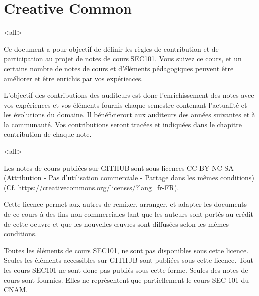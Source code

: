 
%

\section{Creative Common}

\mode<all>{
{
Ce document a pour objectif de définir les règles de contribution et de participation au projet de notes de cours SEC101. Vous suivez ce cours, et un certains nombre de notes de cours et d'éléments pédagogiques peuvent être améliorer et être enrichis par vos expériences.

L'objectif des contributions des auditeurs est donc l'enrichissement des notes avec vos expériences et vos éléments fournis chaque semestre contenant l'actualité et les évolutions du domaine. Il bénéficieront aux auditeurs des années suivantes et à la communauté. Vos contributions seront tracées et indiquées dans le chapitre contribution de chaque note. 

}} %

\mode<all>{
{
Les notes de cours publiées sur GITHUB sont sous licences CC BY-NC-SA (Attribution - Pas d’utilisation commerciale - Partage dans les mêmes conditions)(Cf. \url{https://creativecommons.org/licenses/?lang=fr-FR}).

Cette licence permet aux autres de remixer, arranger, et adapter les documents de ce cours à des fins non commerciales tant que les auteurs sont portés au crédit de cette oeuvre et que les nouvelles œuvres sont diffusées selon les mêmes conditions.
}} %

Toutes les éléments de cours SEC101, ne sont pas disponibles sous cette licence. Seules les éléments accessibles sur GITHUB sont publiées sous cette licence. Tout les cours SEC101 ne sont donc pas publiés sous cette forme. Seules des notes de cours sont fournies.  Elles ne représentent que partiellement le cours SEC 101 du CNAM.



